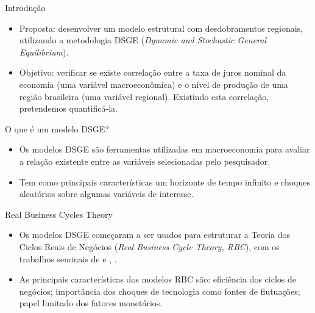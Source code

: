 \documentclass[10pt]{beamer}
\let\olditem\item
\renewcommand{\item}{%
	\olditem\vspace{5pt}}
\begin{document}

\begin{frame}{Introdução}
	
	\begin{itemize}
		\item Proposta: desenvolver um modelo estrutural com desdobramentos regionais, utilizando a metodologia DSGE (\textit{Dynamic and Stochastic General Equilibrium}).
		\item Objetivo: verificar se existe correlação entre a taxa de juros nominal da economia (uma variável macroeconômica) e o nível de produção de uma região brasileira (uma variável regional). Existindo esta correlação, pretendemos quantificá-la.
	\end{itemize}
	
\end{frame}


\begin{frame}{O que é um modelo DSGE?}
	
	\begin{itemize}
		\item Os modelos DSGE são ferramentas utilizadas em macroeconomia para avaliar a relação existente entre as variáveis selecionadas pelo pesquisador.
		\item Tem como principais características um horizonte de tempo infinito e choques aleatórios sobre algumas variáveis de interesse.
	\end{itemize}
	
\end{frame}


\begin{frame}{Real Business Cycles Theory}
	
	\begin{itemize}
		\item Os modelos DSGE começaram a ser usados para estruturar a Teoria dos Ciclos Reais de Negócios (\textit{Real Business Cycle Theory, RBC}), com os trabalhos seminais de \textcite{kydland_time_1982} e \textcite{prescott_theory_1986}, \textcite{gali_monetary_2015}.
		\item As principais características dos modelos RBC são: eficiência dos ciclos de negócios; importância dos choques de tecnologia como fontes de flutuações; papel limitado dos fatores monetários.
	\end{itemize}
	
\end{frame}
\end{document}
